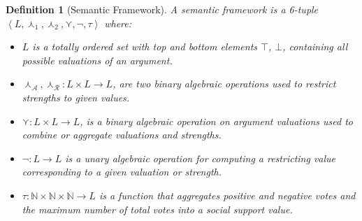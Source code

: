 \documentclass{article}
\newtheorem{definition}{Definition}
\newcommand{\nat}{\mathbb{N}}   %
\newcommand{\args}{\mathcal{A}} %
\newcommand{\att}{\mathcal{R}}  %
\newcommand{\valueset}{L}
\newcommand{\sembody}{\left\langle \valueset,\SAFand_1, \SAFand_2,\SAFor,\lnot,\tau \right\rangle}
\newcommand{\SAFand}{\curlywedge}     %
\newcommand{\SAFor}{\curlyvee}        %
\begin{document}
\begin{definition}[Semantic Framework]
\label{def:semfram}
A semantic framework is a 6-tuple \\$\sembody$ where:

\begin{itemize}
  \item $\valueset$ is a totally ordered set with top and bottom elements $\top$, 
$\bot$, containing all possible valuations of an argument. 

  \item $\SAFand_\args,\SAFand_\att:\valueset\times \valueset\rightarrow \valueset$, are two binary algebraic operations used to restrict strengths to given values.
  
  \item $\SAFor:\valueset\times \valueset\rightarrow \valueset$, is a binary algebraic operation on argument valuations used to combine or aggregate valuations and strengths.
  
  \item $\lnot:\valueset\rightarrow \valueset$ is a unary algebraic operation for computing a restricting value corresponding to a given valuation or strength.
  
  \item $\tau : \nat \times \nat \times \nat \to L$ is a function that aggregates positive and negative votes and the maximum number of total votes into a \emph{social support} value.
\end{itemize}
\end{definition}
\end{document}
